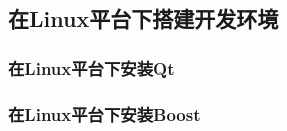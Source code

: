 ﻿%




%


\subsection{
在Linux平台下搭建开发环境
}\label{s000210}



\subsubsection{
在Linux平台下安装Qt
}\label{ss000410}





\subsubsection{
在Linux平台下安装Boost
}\label{ss000510}















